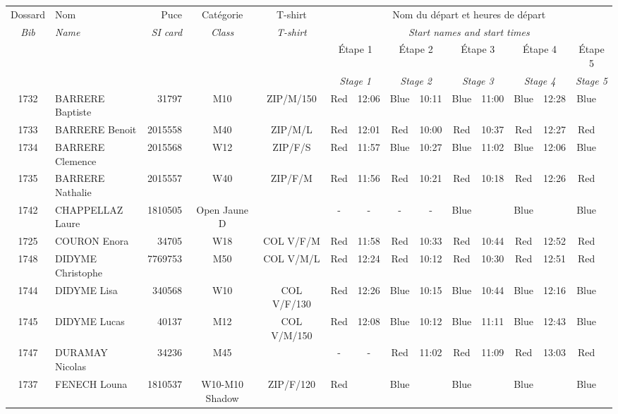 \documentclass{report}
\begin{document}
  \begin{longtable}{|c|l|r|c|c|*{5}{cc|}}
    Dossard & Nom  & Puce    & Catégorie & T-shirt & \multicolumn{10}{c|}{Nom du départ et heures de départ} \\
    \itshape Bib     & \itshape Name & \itshape SI card & \itshape Class  & \itshape  T-shirt  & \multicolumn{10}{c|}{\itshape Start names and start times} \\
    \hline
    & & & & & \multicolumn{2}{c|}{Étape 1} & \multicolumn{2}{c|}{Étape 2} & \multicolumn{2}{c|}{Étape 3} & \multicolumn{2}{c|}{Étape 4} & \multicolumn{2}{c|}{Étape 5} \\
    & & & & & \multicolumn{2}{c|}{\itshape Stage 1} & \multicolumn{2}{c|}{\itshape Stage 2} & \multicolumn{2}{c|}{\itshape Stage 3} & \multicolumn{2}{c|}{\itshape Stage 4} & \multicolumn{2}{c|}{\itshape Stage 5} \\
    \hline
    1732 & BARRERE Baptiste & 31797 & M10 & ZIP/M/150 & Red & 12:06 & Blue & 10:11 & Blue & 11:00 & Blue & 12:28 & Blue &  \\
    1733 & BARRERE Benoit & 2015558 & M40 & ZIP/M/L & Red & 12:01 & Red & 10:00 & Red & 10:37 & Red & 12:27 & Red &  \\
    1734 & BARRERE Clemence & 2015568 & W12 & ZIP/F/S & Red & 11:57 & Blue & 10:27 & Blue & 11:02 & Blue & 12:06 & Blue &  \\
    1735 & BARRERE Nathalie & 2015557 & W40 & ZIP/F/M & Red & 11:56 & Red & 10:21 & Red & 10:18 & Red & 12:26 & Red &  \\
    1742 & CHAPPELLAZ Laure & 1810505 & Open Jaune D &   & - &  - & - &  - & Blue &   & Blue &   & Blue &  \\
    1725 & COURON Enora & 34705 & W18 & COL V/F/M & Red & 11:58 & Red & 10:33 & Red & 10:44 & Red & 12:52 & Red &  \\
    1748 & DIDYME Christophe & 7769753 & M50 & COL V/M/L & Red & 12:24 & Red & 10:12 & Red & 10:30 & Red & 12:51 & Red &  \\
    1744 & DIDYME Lisa & 340568 & W10 & COL V/F/130 & Red & 12:26 & Blue & 10:15 & Blue & 10:44 & Blue & 12:16 & Blue &  \\
    1745 & DIDYME Lucas & 40137 & M12 & COL V/M/150 & Red & 12:08 & Blue & 10:12 & Blue & 11:11 & Blue & 12:43 & Blue &  \\
    1747 & DURAMAY Nicolas & 34236 & M45 &   & - &  - & Red & 11:02 & Red & 11:09 & Red & 13:03 & Red &  \\
    1737 & FENECH Louna & 1810537 & W10-M10 Shadow & ZIP/F/120 & Red &   & Blue &   & Blue &   & Blue &   & Blue &  \\

\end{longtable}
\end{document}
